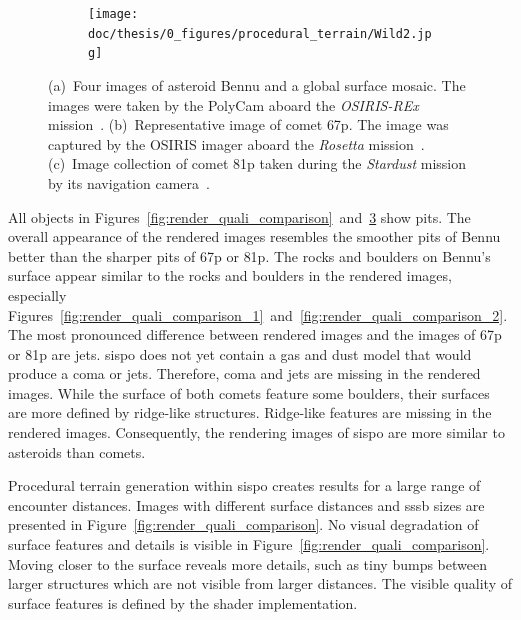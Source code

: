 \begin{figure}[htb]
\begin{subfigure}[b]{0.425\textwidth}
        \caption{}
        \label{fig:render_quali_67p}
    \end{subfigure} %
    \begin{subfigure}[b]{0.565\textwidth}
        \centering
        \texttt{[image: doc/thesis/0\_figures/procedural\_terrain/Wild2.jpg]}
        \caption{}
        \label{fig:render_quali_81p}
    \end{subfigure}
    \caption{(a)~Four images of asteroid Bennu and a global surface mosaic. The images were taken by the PolyCam aboard the \textit{OSIRIS-REx} mission~\cite{NASAFourBennu}. (b)~Representative image of comet \gls{67p}. The image was captured by the OSIRIS imager aboard the \textit{Rosetta} mission~\cite{OSIRISArchiveb}. (c)~Image collection of comet \gls{81p} taken during the \textit{Stardust} mission by its navigation camera~\cite{StardustImages}.}
    \label{fig:render_quali}
\end{figure}

All objects in Figures~\ref{fig:render_quali_comparison}~and~\ref{fig:render_quali} show pits. The overall appearance of the rendered images resembles the smoother pits of Bennu better than the sharper pits of \gls{67p} or \gls{81p}. The rocks and boulders on Bennu's surface appear similar to the rocks and boulders in the rendered images, especially Figures~\ref{fig:render_quali_comparison_1}~and~\ref{fig:render_quali_comparison_2}. The most pronounced difference between rendered images and the images of \gls{67p} or \gls{81p} are jets. \Gls{sispo} does not yet contain a gas and dust model that would produce a coma or jets. Therefore, coma and jets are missing in the rendered images. While the surface of both comets feature some boulders, their surfaces are more defined by ridge-like structures. Ridge-like features are missing in the rendered images. Consequently, the rendering images of \gls{sispo} are more similar to asteroids than comets.

Procedural terrain generation within \gls{sispo} creates results for a large range of encounter distances. Images with different surface distances and \gls{sssb} sizes are presented in Figure~\ref{fig:render_quali_comparison}. No visual degradation of surface features and details is visible in Figure~\ref{fig:render_quali_comparison}. Moving closer to the surface reveals more details, such as tiny bumps between larger structures which are not visible from larger distances. The visible quality of surface features is defined by the shader implementation. 

\clearpage

